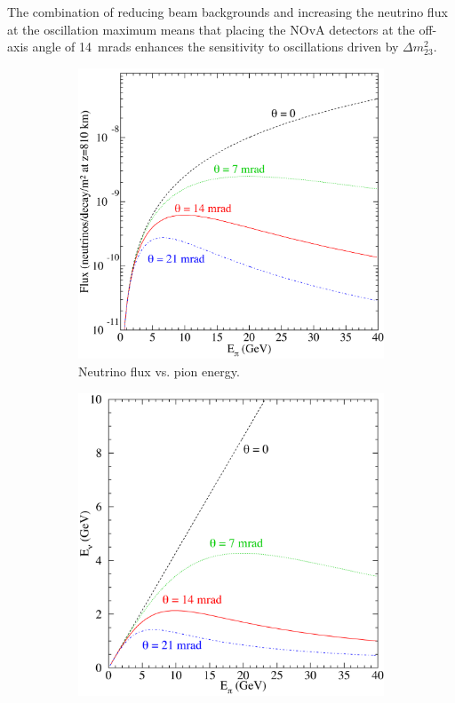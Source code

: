 The combination of reducing beam backgrounds and increasing the
neutrino flux at the oscillation maximum means that placing the
NOvA detectors at the off-axis angle of 14~mrads enhances the
sensitivity to oscillations driven by $\Delta m^2_{23}$.

\begin{figure}
  \centering
  \begin{subfigure}[b]{0.45\textwidth}
  \includegraphics[width=\textwidth]{../../img/baird/beam/020-flux.png}
  \caption{Neutrino flux vs. pion energy. }
  \label{fig:NuPiFluxa}
  \end{subfigure}
  \hfill
  \begin{subfigure}[b]{0.45\textwidth}
  \includegraphics[width=\textwidth]{../../img/baird/beam/030-epi2enu.png}

\end{subfigure}
\end{figure}
